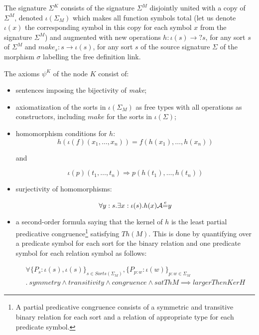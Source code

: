 The signature $\Sigma^K$ consists of the signature $\Sigma^M$ disjointly 
united with a copy of $\Sigma^M$, denoted $\iota(\Sigma_M)$ which makes all function symbols total 
(let us denote $\iota(x)$ the corresponding symbol in this copy for each
symbol $x$ from the signature $\Sigma^M$) and augmented with new operations 
$h: \iota(s) \rightarrow ?s$, for any sort $s$ of $\Sigma^M$ and 
$make_s:s\rightarrow \iota(s)$, for any sort $s$ of the source
signature $\Sigma$ of the morphism $\sigma$  labelling the free definition link.

The axioms $\psi^K$ of the node $K$ consist of:

\begin{itemize}

\item
sentences imposing the bijectivity of \textit{make};

\item axiomatization of the sorts in $\iota(\Sigma_M)$ as free types
with all operations as constructors, including $make$ for the sorts
in $\iota(\Sigma)$;

\item homomorphism conditions for $h$:
 $$ h(\iota(f)(x_1, \dots, x_n)) = f(h(x_1), \dots, h(x_n)) $$
 
and

$$\iota(p)(t_1, \dots, t_n) \Rightarrow p(h(t_1), \dots, h(t_n))$$

\item surjectivity of homomorphisms:

$$\forall y : s . \exists x:\iota(s) . h(x) \mathcal{A}{\stackrel{e}{=}} y$$

\item a second-order formula saying that the kernel of $h$ is the least
partial predicative congruence\footnote
{A partial predicative congruence consists of a symmetric 
and transitive binary relation for each sort and a relation
of appropriate type for each predicate symbol.} satisfying
$Th(M)$. This is done by quantifying over a predicate symbol for each sort
for the binary relation and one predicate symbol for each relation symbol
as follows: 

$$\begin{array}{l}
 \forall \{P_s : \iota(s),  \iota(s)\}_{s \in Sorts(\Sigma_M)} ,
           \{P_{p:w} : \iota(w)\} _{p:w \in \Sigma_M} \\
 .~ 
\mathit{symmetry}
 \land \mathit{transitivity}
 \land  \mathit{congruence}
\land \mathit{satThM}
\implies \mathit{largerThenKerH}
\end{array}
$$


\end{itemize}
